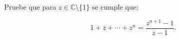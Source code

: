 \documentclass[../main.tex]{subfiles}
\begin{document}
\begin{problema}
	Pruebe que para \(z \in \mathbb{C}\setminus \{1\}\) se cumple que:

	\begin{equation*}
		1 + z + \cdots + z^{n} = \dfrac{z^{n + 1} - 1}{z - 1}.
	\end{equation*}
\end{problema}
\end{document}
